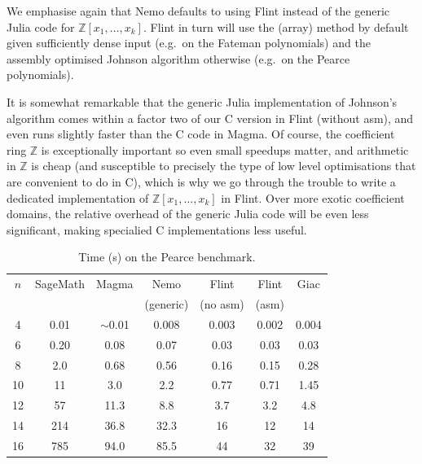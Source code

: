 \documentclass{sig-alternate-05-2015}
\begin{document}
We emphasise again that Nemo defaults to using Flint instead of the generic
Julia code for $\mathbb{Z}[x_1,\ldots,x_k]$.
Flint in turn will use the (array) method by default
given sufficiently dense input (e.g.\ on the Fateman polynomials)
and the assembly optimised Johnson algorithm otherwise (e.g.\ on the Pearce polynomials).

It is somewhat remarkable that the generic Julia implementation
of Johnson's algorithm comes
within a factor two of our C version in Flint (without asm),
and even runs slightly faster than the C code in Magma.
Of course, the coefficient ring $\mathbb{Z}$ is exceptionally important
so even small speedups matter,
and arithmetic in $\mathbb{Z}$ is cheap
(and susceptible to precisely the type of low level optimisations
that are convenient to do in C), which is why we go through
the trouble to write a dedicated implementation of $\mathbb{Z}[x_1,\ldots,x_k]$ in Flint.
Over more exotic coefficient domains, the relative
overhead of the generic Julia code will be even less significant,
making specialied C implementations less useful.

\begin{table}
\center
\caption{Time (s) on the Pearce benchmark.}
\begin{small}
\setlength{\tabcolsep}{2.5pt}
\renewcommand{\arraystretch}{1.2}
\begin{tabular}{c c c c c c c} \hline
$n$ & SageMath & Magma & Nemo & Flint & Flint & Giac \\ 
    &          &       & (generic) & (no asm) & (asm) & \\ \hline
     4  &   0.01 & $\sim$0.01  &   0.008          & 0.003         &   0.002             &                     0.004 \\
     6  &   0.20  &   0.08   &     0.07        &     0.03       &       0.03         &                           0.03 \\
     8  &   2.0  &     0.68   &     0.56       &      0.16      &        0.15        &                            0.28 \\
    10  &   11   &     3.0    &       2.2      &       0.77     &         0.71       &                             1.45 \\
    12  &   57   &    11.3    &      8.8       &        3.7     &           3.2      &                                4.8 \\
    14  &  214   &   36.8     &   32.3         &       16       &         12         &                               14 \\
    16  &  785   &   94.0     &   85.5         &       44       &         32         &                               39 \\
\end{tabular}
\label{tab:pearce}
\end{small}
\end{table}
\end{document}
